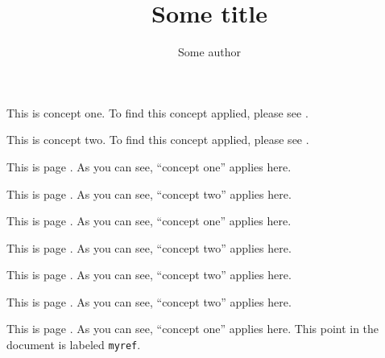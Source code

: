 \documentclass{article}
\begin{document}
\title{Some title}

\author{Some author}

\maketitle

This is concept one. To find this concept applied, please see
.

This is concept two. To find this concept applied, please see
.\newpage

This is page \thepage. As you can see, ``concept
one'' applies here.\newpage

This is page \thepage. As you can see, ``concept
two'' applies here.\newpage

This is page \thepage. As you can see, ``concept
one'' applies here.\newpage

This is page \thepage. As you can see, ``concept
two'' applies here.\newpage

This is page \thepage. As you can see, ``concept
two'' applies here.\newpage

This is page \thepage. As you can see, ``concept
two'' applies here.\newpage

This is page \thepage. As you can
see, ``concept one'' applies here. This point in the document is
labeled \texttt{myref}.
\end{document}
